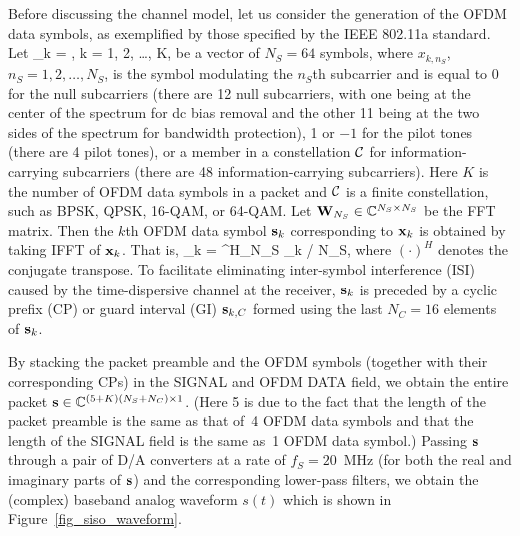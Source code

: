 \documentclass[11pt,draftnofoot,onecolumn]{IEEEtran}
\begin{document}
Before discussing the channel model, let us consider the generation
of the OFDM data symbols, as exemplified by those specified by the
IEEE 802.11a standard. Let %
\ben
\xbf_{k} = , \quad
k = 1, 2, \dots, K, %
\label{equ_siso_symbols} %
\een %
be a vector of $N_S = 64$ symbols, where $x_{k,n_S}$, $n_S = 1, 2,
\dots, N_S$, is the symbol modulating the $n_S$th subcarrier and is
equal to 0 for the null subcarriers (there are 12 null subcarriers,
with one being at the center of the spectrum for dc bias removal and
the other 11 being at the two sides of the spectrum for bandwidth
protection), 1 or $-1$ for the pilot tones (there are 4 pilot
tones), or a member in a constellation $\Ccal$ for information-carrying
subcarriers (there are 48 information-carrying subcarriers). Here $K$ is
the number of OFDM data symbols in a packet and $\Ccal$ is a finite
constellation, such as BPSK, QPSK, 16-QAM, or 64-QAM. Let
${\bf W}_{N_S} \in {{\mathbb C}}^{N_S\times N_S}$ be the FFT matrix.
Then the $k$th OFDM data symbol ${\bf s}_k$ corresponding to ${\bf x}_{k}$
is obtained by taking
IFFT of ${\bf x}_{k}$. That is, %
\ben %
\sbf_k = \Wbf^H_{N_S} \xbf_{k} / N_S, %
\een %
where $(\cdot)^H$ denotes the conjugate transpose. To facilitate
eliminating inter-symbol interference (ISI) caused by the
time-dispersive channel at the receiver, ${\bf s}_{k}$ is preceded by a
cyclic prefix (CP) or guard interval (GI) ${\bf s}_{k,C}$ formed using
the last $N_C = 16$ elements of ${\bf s}_k$.

By stacking the packet preamble and the OFDM symbols (together with
their corresponding CPs) in the SIGNAL and OFDM DATA field, we
obtain the entire packet ${\bf s}\in {{\mathbb
C}}^{(5+K)(N_S+N_C)\times 1}$. (Here 5 is due to the fact that the
length of the packet preamble is the same as that 
of~4 OFDM data symbols and that
the length of the SIGNAL field is the same as~1 OFDM data symbol.) Passing
${\bf s}$ through a pair of D/A converters at a rate of $f_S = 20$~MHz
(for both the real and imaginary parts of ${\bf s}$) and the
corresponding lower-pass filters, we obtain the (complex) baseband
analog waveform $s (t)$ which is shown in 
Figure~\ref{fig_siso_waveform}.

\end{document}
